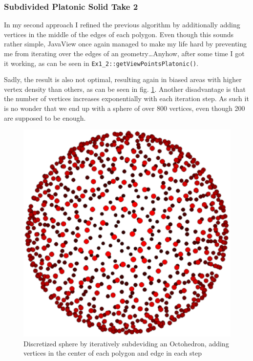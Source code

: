 \documentclass[a4paper,10pt,notitlepage]{scrreprt}
\begin{document}
\subsubsection{Subdivided Platonic Solid Take 2}

In my second approach I refined the previous algorithm by additionally adding
vertices in the middle of the edges of each polygon. Even though this sounds
rather simple, JavaView once again managed to make my life hard by preventing
me from iterating over the edges of an geometry\dots Anyhow, after some time I
got it working, as can be seen in \texttt{Ex1\_2::getViewPointsPlatonic()}.

Sadly, the result is also not optimal, resulting again in biased areas with
higher vertex density than others, as can be seen in fig.
\ref{fig:grid-platonic}. Another disadvantage is that the number of vertices
increases exponentially with each iteration step. As such it is no wonder that
we end up with a sphere of over 800 vertices, even though 200 are supposed to be
enough.

\begin{figure}
 \centering
 \includegraphics[scale=0.5]{platonic-grid.eps}
 \caption{Discretized sphere by iteratively subdeviding an Octohedron, adding
vertices in the center of each polygon and edge in each step}
 \label{fig:grid-platonic}
\end{figure}
\end{document}
